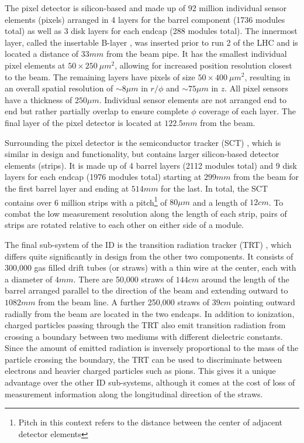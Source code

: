 The pixel detector \cite{pernegger-pixel-detector} is silicon-based and made up of 92 million individual sensor 
elements (pixels) arranged in 4 layers for the barrel component (1736 modules total) as well as 3 disk layers for each 
endcap (288 modules total). The innermost layer, called the insertable B-layer \cite{atlas-insertable-b-layer}, was 
inserted prior to run 2 of the LHC and is located a distance of $33mm$ from the beam pipe. It has the smallest individual 
pixel elements at $50\times250\ \mu m^2$, allowing for increased position resolution closest to the beam. The remaining 
layers have pixels of size $50\times400\ \mu m^2$, resulting in an overall spatial resolution of $\sim 8 \mu m$ in 
$r/\phi$ and $\sim 75 \mu m$ in $z$. All pixel sensors have a thickness of $250 \mu m$. Individual sensor elements 
are not arranged end to end but rather partially overlap to ensure complete $\phi$ coverage of each layer. The final 
layer of the pixel detector is located at $122.5mm$ from the beam. \par

Surrounding the pixel detector is the semiconductor tracker (SCT) \cite{atlas-sct}, which is similar in design and 
functionality, but contains larger silicon-based detector elements (strips). It is made up of 4 barrel layers (2112 
modules total) and 9 disk layers for each endcap (1976 modules total) starting at $299mm$ from the beam for the first 
barrel layer and ending at $514mm$ for the last. In total, the SCT contains over 6 million strips with a 
pitch\footnote{Pitch in this context refers to the distance between the center of adjacent detector elements} of 
$80\mu m$ and a length of $12cm$. To combat the low measurement resolution along the length of each strip, pairs of 
strips are rotated relative to each other on either side of a module. \par

The final sub-system of the ID is the transition radiation tracker (TRT) \cite{atlas-trt}, which differs quite 
significantly in design from the other two components. It consists of 300,000 gas filled drift tubes (or straws) with 
a thin wire at the center, each with a diameter of $4mm$. There are 50,000 straws of $144cm$ around the length of the 
barrel arranged parallel to the direction of the beam and extending outward to $1082mm$ from the beam line. A further 
250,000 straws of $39cm$ pointing outward radially from the beam are located in the two endcaps. In addition to 
ionization, charged particles passing through the TRT also emit transition radiation from crossing a boundary between 
two mediums with different dielectric constants. Since the amount of emitted radiation is inversely proportional to the 
mass of the particle crossing the boundary, the TRT can be used to discriminate between electrons and heavier charged 
particles such as pions. This gives it a unique advantage over the other ID sub-systems, although it comes at the cost 
of loss of measurement information along the longitudinal direction of the straws. \par

